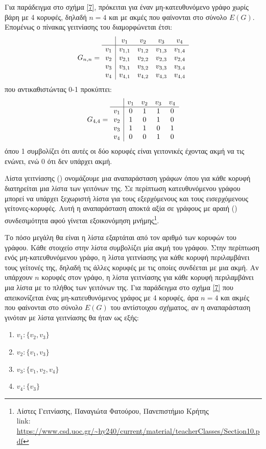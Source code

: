 Για παράδειγμα στο σχήμα \ref{7}, πρόκειται για έναν μη-κατευθυνόμενο γράφο χωρίς βάρη με 4 κορυφές, δηλαδή $n=4$ και με ακμές που φαίνονται στο σύνολο $E(G)$. Επομένως ο πίνακας γειτνίασης του διαμορφώνεται έτσι: 
$$
G_{n,n} = 
\begin{array}{c|c c c c}
   & v_{1} & v_{2} & v_{3} & v_{4} \\ \hline
   v_{1} & v_{1,1} & v_{1,2} & v_{1,3} & v_{1,4} \\
   v_{2} & v_{2,1} & v_{2,2} &   v_{2,3} & v_{2,4} \\
   v_{3} & v_{3,1} & v_{3,2} & v_{3,3} & v_{3,4} \\
   v_{4} & v_{4,1} & v_{4,2} & v_{4,3} & v_{4,4} 
\end{array}
$$
που αντικαθιστώντας 0-1 προκύπτει: 
$$
G_{4,4} = 
\begin{array}{c|c c c c}
   & v_{1} & v_{2} & v_{3} & v_{4} \\ \hline
   v_{1} & 0 & 1 & 1 & 0 \\
   v_{2} & 1 & 0 & 1 & 0 \\
   v_{3} & 1 & 1 & 0 & 1 \\
   v_{4} & 0 & 0 & 1 & 0 
\end{array}
$$
όπου 1 συμβολίζει ότι αυτές οι δύο κορυφές είναι γειτονικές έχοντας ακμή να τις ενώνει, ενώ 0 ότι δεν υπάρχει ακμή.

Λίστα γειτνίασης () ονομάζουμε μια αναπαράσταση γράφων όπου για κάθε κορυφή διατηρείται μια λίστα των γειτόνων της. Σε περίπτωση κατευθυνόμενου γράφου μπορεί να υπάρχει ξεχωριστή λίστα για τους εξερχόμενους και τους εισερχόμενους γείτονες-κορυφές. Αυτή η αναπαράσταση αποκτά αξία σε γράφους με αραιή () συνδεσιμότητα αφού γίνεται εξοικονόμηση μνήμης\footnote{Λίστες Γειτνίασης, Παναγιώτα Φατούρου, Πανεπιστήμιο Κρήτης \\link: \url{https://www.csd.uoc.gr/~hy240/current/material/teacherClasses/Section10.pdf}}.

Το πόσο μεγάλη θα είναι η λίστα εξαρτάται από τον αριθμό των κορυφών του γράφου. Κάθε στοιχείο στην λίστα συμβολίζει μία ακμή του γράφου. Στην περίπτωση ενός μη-κατευθυνόμενου γράφο, η λίστα γειτνίασης για κάθε κορυφή περιλαμβάνει τους γείτονές της, δηλαδή τις άλλες κορυφές με τις οποίες συνδέεται με μια ακμή. Αν υπάρχουν $n$ κορυφές στον γράφο, η λίστα γειτνίασης για κάθε κορυφή περιλαμβάνει μια λίστα με το πλήθος των γειτόνων της. Για παράδειγμα στο σχήμα \ref{7} που απεικονίζεται ένας μη-κατευθυνόμενος γράφος με 4 κορυφές, άρα $n=4$ και ακμές που φαίνονται στο σύνολο $E(G)$ του αντίστοιχου σχήματος, αν η αναπαράσταση γινόταν με λίστα γειτνίασης θα ήταν ως εξής: 
\begin{enumerate}
    \item $v_1: \{v_2, v_3\}$
    \item $v_2: \{v_1, v_3\}$
    \item $v_3: \{v_1, v_2, v_4\}$
    \item $v_4: \{v_3\}$
\end{enumerate}

